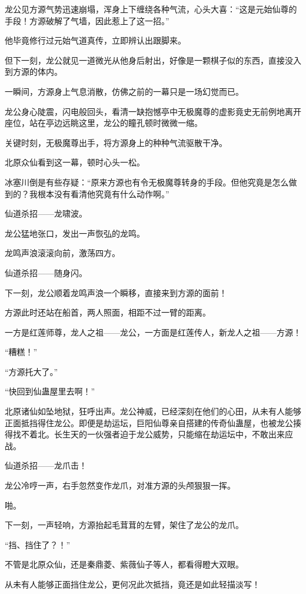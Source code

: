 \begin{this_body}
龙公见方源气势迅速崩塌，浑身上下缠绕各种气流，心头大喜：“这是元始仙尊的手段！方源破解了气墙，因此惹上了这一招。”

他毕竟修行过元始气道真传，立即辨认出跟脚来。

但下一刻，龙公就见一道微光从他身后射出，好像是一颗棋子似的东西，直接没入到方源的体内。

一瞬间，方源身上气息消散，仿佛之前的一幕只是一场幻觉而已。

龙公身心陡震，闪电般回头，看清一缺抱憾亭中无极魔尊的虚影竟史无前例地离开座位，站在亭边远眺这里，龙公的瞳孔顿时微微一缩。

关键时刻，无极魔尊出手，将方源身上的种种气流驱散干净。

北原众仙看到这一幕，顿时心头一松。

冰塞川倒是有些存疑：“原来方源也有令无极魔尊转身的手段。但他究竟是怎么做到的？我根本没有看清他究竟有什么动作啊。”

仙道杀招——龙啸波。

龙公猛地张口，发出一声恢弘的龙鸣。

龙鸣声浪滚滚向前，激荡四方。

仙道杀招——随身闪。

下一刻，龙公顺着龙鸣声浪一个瞬移，直接来到方源的面前！

方源此时还站在船首，两人照面，相距不过一臂的距离。

一方是红莲师尊，龙人之祖——龙公，一方面是红莲传人，新龙人之祖——方源！

“糟糕！”

“方源托大了。”

“快回到仙蛊屋里去啊！”

北原诸仙如坠地狱，狂呼出声。龙公神威，已经深刻在他们的心田，从未有人能够正面抵挡得住龙公。即便是劫运坛，巨阳仙尊亲自搭建的传奇仙蛊屋，也被龙公揍得找不着北。长生天的一伙强者迫于龙公威势，只能缩在劫运坛中，不敢出来应战。

仙道杀招——龙爪击！

龙公冷哼一声，右手忽然变作龙爪，对准方源的头颅狠狠一挥。

啪。

下一刻，一声轻响，方源抬起毛茸茸的左臂，架住了龙公的龙爪。

“挡、挡住了？！”

不管是北原众仙，还是秦鼎菱、紫薇仙子等人，都看得瞪大双眼。

从未有人能够正面挡住龙公，更何况此次抵挡，竟还是如此轻描淡写！


\end{this_body}
